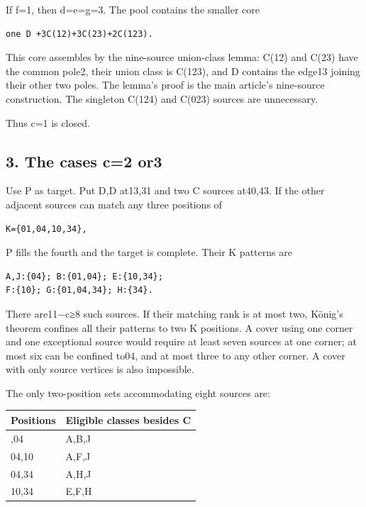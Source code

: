 \documentclass[
  10pt,
]{article}
\begin{document}
If f=1, then d=e=g=3. The pool contains the smaller core

\begin{verbatim}
one D +3C(12)+3C(23)+2C(123).
\end{verbatim}

This core assembles by the nine-source union-class lemma: C(12) and
C(23) have the common pole2, their union class is C(123), and D contains
the edge13 joining their other two poles. The lemma's proof is the main
article's nine-source construction. The singleton C(124) and C(023)
sources are unnecessary.

Thus c=1 is closed.

\hypertarget{the-cases-c2-or3}{%
\subsection*{3. The cases c=2 or3}\label{the-cases-c2-or3}}

Use P as target. Put D,D at13,31 and two C sources at40,43. If the other
adjacent sources can match any three positions of

\begin{verbatim}
K={01,04,10,34},
\end{verbatim}

P fills the fourth and the target is complete. Their K patterns are

\begin{verbatim}
A,J:{04}; B:{01,04}; E:{10,34};
F:{10}; G:{01,04,34}; H:{34}.
\end{verbatim}

There are11−c≥8 such sources. If their matching rank is at most two,
König's theorem confines all their patterns to two K positions. A cover
using one corner and one exceptional source would require at least seven
sources at one corner; at most six can be confined to04, and at most
three to any other corner. A cover with only source vertices is also
impossible.

The only two-position sets accommodating eight sources are:

\begin{longtable}[]{@{}ll@{}}
\toprule\noalign{}
Positions & Eligible classes besides C \\
\midrule\noalign{}
\endhead
\bottomrule\noalign{}
\endlastfoot
01,04 & A,B,J \\
04,10 & A,F,J \\
04,34 & A,H,J \\
10,34 & E,F,H \\
\end{longtable}
\end{document}
